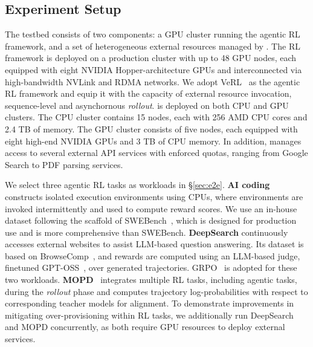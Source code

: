     
\subsection{Experiment Setup}
\label{sec:setup}
 The testbed consists of two components: a GPU cluster running the agentic RL framework, and a set of heterogeneous external resources managed by \sysname.
The RL framework is deployed on a production cluster with up to 48 GPU nodes, each equipped with eight NVIDIA Hopper-architecture GPUs and interconnected via high-bandwidth NVLink and RDMA networks. We adopt VeRL~\citep{sheng2025hybridflow} as the agentic RL framework and equip it with the capacity of external resource invocation, sequence-level and asynchornous \textit{rollout}. 
\sysname is deployed on both CPU and GPU clusters. The CPU cluster contains 15 nodes, each with 256 AMD CPU cores and 2.4 TB of memory. The GPU cluster consists of five nodes, each equipped with eight high-end NVIDIA GPUs and 3 TB of CPU memory. In addition, \sysname manages access to several external API services with enforced quotas, ranging from Google Search to PDF parsing services.

 We select three agentic RL tasks as workloads in \S\ref{sec:e2e}. \textbf{AI coding} constructs isolated execution environments using CPUs, where environments are invoked intermittently and used to compute reward scores.
We use an in-house dataset following the scaffold of SWEBench~\citep{jimenez2024swebench}, which is designed for production use and is more comprehensive than SWEBench.
\textbf{DeepSearch} continuously accesses external websites to assist LLM-based question answering. Its dataset is based on BrowseComp~\citep{wei2025browsecomp}, and rewards are computed using an LLM-based judge, finetuned GPT-OSS~\citep{agarwal2025gpt}, over generated trajectories. 
GRPO~\citep{shao2024deepseekmath} is adopted for these two workloads.
\textbf{MOPD}~\citep{xiao2026mimo} integrates multiple RL tasks, including agentic tasks, during the \textit{rollout} phase and computes trajectory log-probabilities with respect to corresponding teacher models for alignment.
To demonstrate improvements in mitigating over-provisioning within RL tasks, we additionally run DeepSearch and MOPD concurrently, as both require GPU resources to deploy external services.

